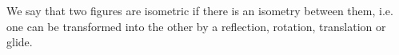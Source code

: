 We say that two figures are isometric if there 
is an isometry between them, i.e. one can be transformed
into the other by a reflection, rotation, translation
or glide.
